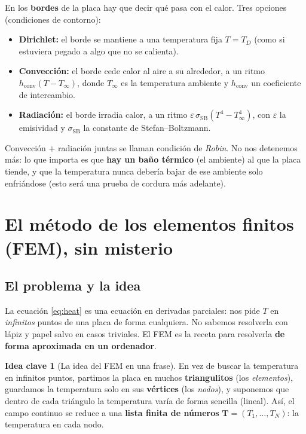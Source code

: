 \documentclass[11pt]{article}
\newcommand{\Tinf}{T_{\infty}}
\theoremstyle{definition}
\newtheorem{idea}{Idea clave}[section]
\theoremstyle{plain}
\begin{document}
En los \textbf{bordes} de la placa hay que decir qué pasa con el calor. Tres
opciones (condiciones de contorno):
\begin{itemize}[leftmargin=1.5em]
  \item \textbf{Dirichlet:} el borde se mantiene a una temperatura fija $T=T_D$
  (como si estuviera pegado a algo que no se calienta).
  \item \textbf{Convección:} el borde cede calor al aire a su alrededor, a un ritmo
  $h_{\mathrm{conv}}(T-\Tinf)$, donde $\Tinf$ es la temperatura ambiente y
  $h_{\mathrm{conv}}$ un coeficiente de intercambio.
  \item \textbf{Radiación:} el borde irradia calor, a un ritmo
  $\varepsilon\,\sigma_{\mathrm{SB}}(T^4-\Tinf^4)$, con $\varepsilon$ la emisividad
  y $\sigma_{\mathrm{SB}}$ la constante de Stefan--Boltzmann.
\end{itemize}
Convección $+$ radiación juntas se llaman condición de \emph{Robin}. No nos
detenemos más: lo que importa es que \textbf{hay un baño térmico} (el ambiente) al
que la placa tiende, y que la temperatura nunca debería bajar de ese ambiente solo
enfriándose (esto será una prueba de cordura más adelante).

\section{El método de los elementos finitos (FEM), sin misterio}
\label{sec:fem}

\subsection{El problema y la idea}

La ecuación \eqref{eq:heat} es una ecuación en derivadas parciales: nos pide $T$ en
\emph{infinitos} puntos de una placa de forma cualquiera. No sabemos resolverla con
lápiz y papel salvo en casos triviales. El FEM es la receta para resolverla
\textbf{de forma aproximada en un ordenador}.

\begin{idea}[La idea del FEM en una frase]
En vez de buscar la temperatura en infinitos puntos, partimos la placa en muchos
\textbf{triangulitos} (los \emph{elementos}), guardamos la temperatura solo en sus
\textbf{vértices} (los \emph{nodos}), y suponemos que dentro de cada triángulo la
temperatura varía de forma sencilla (lineal). Así, el campo continuo se reduce a
una \textbf{lista finita de números} $\bm T = (T_1,\dots,T_N)$: la temperatura en
cada nodo.
\end{idea}
\end{document}
